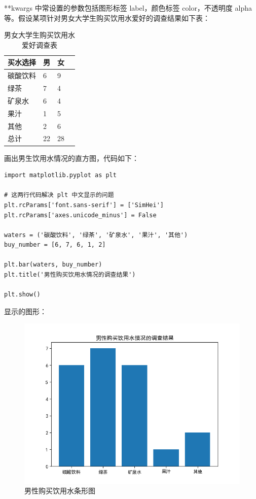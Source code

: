**kwargs 中常设置的参数包括图形标签 label，颜色标签 color，不透明度 alpha 等。假设某项针对男女大学生购买饮用水爱好的调查结果如下表：

\begin{table}[!ht]
\centering
\caption{男女大学生购买饮用水爱好调查表}
\renewcommand{\arraystretch}{1.2}
\begin{tabular}{|l|l|l|l|}
\hline
买水选择 & 男 & 女 \\ \hline
碳酸饮料 & 6 & 9 \\ \hline
绿茶 & 7 & 4 \\ \hline
矿泉水 & 6 & 4 \\ \hline
果汁 & 1 & 5 \\ \hline
其他 & 2 & 6 \\ \hline
总计 & 22 & 28 \\ \hline
\end{tabular}
\end{table}

画出男生饮用水情况的直方图，代码如下：

\begin{lstlisting}[Language=Python]
import matplotlib.pyplot as plt

# 这两行代码解决 plt 中文显示的问题
plt.rcParams['font.sans-serif'] = ['SimHei']
plt.rcParams['axes.unicode_minus'] = False

waters = ('碳酸饮料', '绿茶', '矿泉水', '果汁', '其他')
buy_number = [6, 7, 6, 1, 2]

plt.bar(waters, buy_number)
plt.title('男性购买饮用水情况的调查结果')

plt.show()
\end{lstlisting}

显示的图形：
\begin{figure}[!ht]
  \centering
  \includegraphics[scale=0.8]{figure/bar1.png}
  \caption{男性购买饮用水条形图}
\end{figure}


